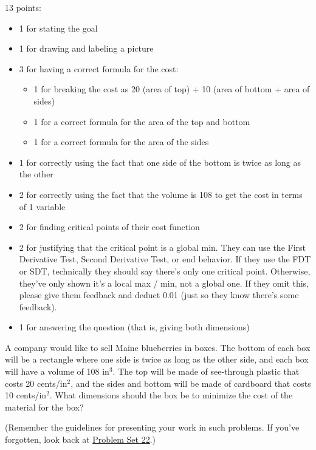 \documentclass{article}
\makeatletter
\let\@href=\href
\renewcommand{\href}[2]{\@href{#1}{\ul{#2}}}
\makeatother
\begin{document}
\begin{enumerate}
  \begin{grading}
    13 points:
    \begin{itemize}[nosep]
    \item 1 for stating the goal
    \item 1 for drawing and labeling a picture
    \item 3 for having a correct formula for the cost:
      \begin{itemize}[nosep]
      \item 1 for breaking the cost as 20 (area of top) + 10 (area of bottom + area of sides)
      \item 1 for a correct formula for the area of the top and bottom
      \item 1 for a correct formula for the area of the sides
      \end{itemize}
    \item 1 for correctly using the fact that one side of the bottom is twice as long as the other
    \item 2 for correctly using the fact that the volume is 108 to get the cost in terms of 1 variable
    \item 2 for finding critical points of their cost function
    \item 2 for justifying that the critical point is a global min. They can use the First Derivative Test, Second Derivative Test, or end behavior. If they use the FDT or SDT, technically they should say there's only one critical point. Otherwise, they've only shown it's a local max / min, not a global one. If they omit this, please give them feedback and deduct 0.01 (just so they know there's some feedback). 
    \item 1 for answering the question (that is, giving both dimensions)
    \end{itemize}
  \end{grading}

  \begin{problem}[\newpage]
    A company would like to sell Maine blueberries in boxes. The bottom of each box will be a rectangle where one side is twice as long as the other side, and each box will have a volume of 108 in$^3$. The top will be made of see-through plastic that costs 20 cents/in$^2$, and the sides and bottom will be made of cardboard that costs 10 cents/in$^2$. What dimensions should the box be to minimize the cost of the material for the box?

    (Remember the guidelines for presenting your work in such problems. If you've forgotten, look back at \href{https://canvas.harvard.edu/files/21097693/download?download_frd=1}{Problem Set 22}.) 
  \end{problem}


\end{enumerate}
\end{document}
